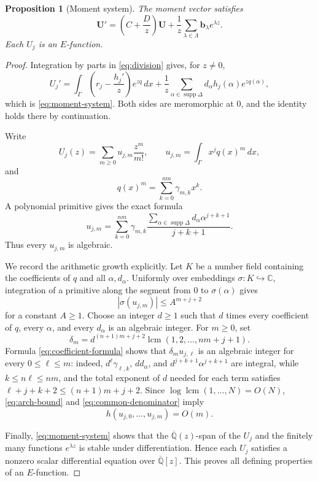 \documentclass[11pt]{article}
\numberwithin{equation}{section}
\newtheorem{proposition}[proposition]{Proposition}
\theoremstyle{definition}
\theoremstyle{remark}
\newcommand{\C}{\mathbb C}
\newcommand{\Qbar}{\overline{\mathbb Q}}
\newcommand{\supp}{\operatorname{supp}}
\begin{document}
\begin{proposition}[Moment system]\label{prop:moment-system}
The moment vector satisfies
\begin{equation}\label{eq:moment-system}
  \mathbf U'
  =\left(C+\frac Dz\right)\mathbf U
   +\frac1z\sum_{\lambda\in\Lambda}
      \mathbf b_\lambda e^{\lambda z}.
\end{equation}
Each $U_j$ is an $E$-function.
\end{proposition}

\begin{proof}
Integration by parts in \eqref{eq:division} gives, for $z\ne0$,
\[
  U_j'
  =\int_\Gamma\left(r_j-\frac{h_j'}z\right)e^{zq}\,dx
   +\frac1z\sum_{\alpha\in\supp\Delta}
      d_\alpha h_j(\alpha)e^{zq(\alpha)},
\]
which is \eqref{eq:moment-system}.  Both sides are meromorphic at $0$, and
the identity holds there by continuation.

Write
\[
  U_j(z)=\sum_{m\ge0}u_{j,m}\frac{z^m}{m!},
  \qquad
  u_{j,m}=\int_\Gamma x^j q(x)^m\,dx,
\]
and
\[
  q(x)^m=\sum_{k=0}^{nm}\gamma_{m,k}x^k.
\]
A polynomial primitive gives the exact formula
\begin{equation}\label{eq:coefficient-formula}
  u_{j,m}=\sum_{k=0}^{nm}\gamma_{m,k}
  \frac{\displaystyle\sum_{\alpha\in\supp\Delta}
        d_\alpha\alpha^{j+k+1}}{j+k+1}.
\end{equation}
Thus every $u_{j,m}$ is algebraic.

We record the arithmetic growth explicitly.  Let $K$ be a number field
containing the coefficients of $q$ and all $\alpha,d_\alpha$.  Uniformly
over embeddings $\sigma:K\hookrightarrow\C$, integration of a primitive
along the segment from $0$ to $\sigma(\alpha)$ gives
\begin{equation}\label{eq:arch-bound}
  |\sigma(u_{j,m})|\le A^{m+j+2}
\end{equation}
for a constant $A\ge1$.  Choose an integer $d\ge1$ such that $d$ times
every coefficient of $q$, every $\alpha$, and every $d_\alpha$ is an
algebraic integer.  For $m\ge0$, set
\begin{equation}\label{eq:common-denominator}
  \delta_m=
  d^{(n+1)m+j+2}\operatorname{lcm}(1,2,\ldots,nm+j+1).
\end{equation}
Formula \eqref{eq:coefficient-formula} shows that
$\delta_m u_{j,\ell}$ is an algebraic integer for every $0\le\ell\le m$:
indeed, $d^\ell\gamma_{\ell,k}$, $d d_\alpha$, and
$d^{j+k+1}\alpha^{j+k+1}$ are integral, while
$k\le n\ell\le nm$, and the total exponent of $d$ needed for each term
satisfies $\ell+j+k+2\le(n+1)m+j+2$.  Since
$\log\operatorname{lcm}(1,\ldots,N)=O(N)$, \eqref{eq:arch-bound} and
\eqref{eq:common-denominator} imply
\[
  h(u_{j,0},\ldots,u_{j,m})=O(m).
\]

Finally, \eqref{eq:moment-system} shows that the $\Qbar(z)$-span of the
$U_j$ and the finitely many functions $e^{\lambda z}$ is stable under
differentiation.  Hence each $U_j$ satisfies a nonzero scalar differential
equation over $\Qbar[z]$.  This proves all defining properties of an
$E$-function.
\end{proof}
\end{document}
